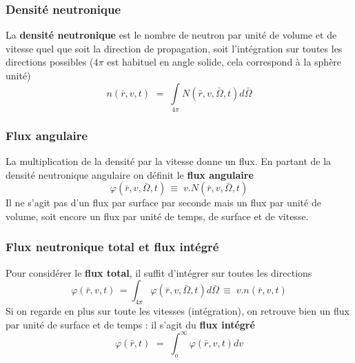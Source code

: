 \subsubsection{Densité neutronique}
La \textbf{densité neutronique} est le nombre de neutron par unité de volume et de vitesse quel 
que soit la direction de propagation, soit l'intégration sur toutes les directions possibles ($4\pi$ 
est habituel en angle solide, cela correspond à la sphère unité)
\begin{equation}
n(\bar r,v,t)\,\, = \;\int\limits_{4\pi }    N(\bar r,v,\bar \Omega ,t)d\bar \Omega 
\end{equation}  

\subsubsection{Flux angulaire}
La multiplication de la densité par la vitesse donne un flux. En partant de la densité neutronique 
angulaire on définit le \textbf{flux angulaire}
\begin{equation}
\varphi (\bar r,v,\bar \Omega ,t)\, \equiv \;v.N(\bar r,v,\bar \Omega ,t)
\end{equation}
Il ne s'agit pas d'un flux par surface par seconde mais un flux par unité de volume, soit encore un
flux par unité de temps, de surface et de vitesse.

\subsubsection{Flux neutronique total et flux intégré}
Pour considérer le \textbf{flux total}, il suffit d'intégrer sur toutes les directions
\begin{equation}
\varphi (\bar r,v,t)\, = \int_{4\pi }^{}    \varphi (\bar r,v,\bar \Omega ,t)d\bar \Omega \, \equiv \;v.n(\bar r,v,t)
\end{equation}
Si on regarde en plus sur toute les vitesses (intégration), on retrouve bien un flux par unité de 
surface et de temps : il s'agit du \textbf{flux intégré}
\begin{equation}
\varphi (\bar r,t)\,\, = \;\int_o^\infty  \varphi  (\bar r,v,t)dv
\end{equation}

